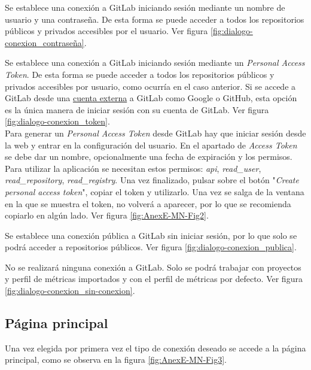 \begin{description}
	\tightlist
	\item[Iniciar sesión en GitLab mediante usuario y contraseña.] Se establece una conexión a GitLab iniciando sesión mediante un nombre de usuario y una contraseña. De esta forma se puede acceder a todos los repositorios públicos y privados accesibles por el usuario. Ver figura \ref{fig:dialogo-conexion_contraseña}.
	\item[Iniciar sesión en GitLab mediante \textit{Personal Access Token}.] Se establece una conexión a GitLab iniciando sesión mediante un \textit{Personal Access Token}. De esta forma se puede acceder a todos los repositorios públicos y privados accesibles por usuario, como ocurría en el caso anterior. 
	Si se accede a GitLab desde una \underline{cuenta externa} a GitLab como Google o GitHub, esta opción es la única manera de iniciar sesión con su cuenta de GitLab. Ver figura \ref{fig:dialogo-conexion_token}.\\
	Para generar un \textit{Personal Access Token} desde GitLab hay que iniciar sesión desde la web y entrar en la configuración del usuario. En el apartado de \textit{Access Token} se debe dar un nombre, opcionalmente una fecha de expiración y los permisos. Para utilizar la aplicación se necesitan estos permisos: \textit{api}, \textit{read\_user}, \textit{read\_repository}, \textit{read\_registry}. Una vez finalizado, pulsar sobre el botón "\textit{Create personal access token}", copiar el token y utilizarlo. Una vez se salga de la ventana en la que se muestra el token, no volverá a aparecer, por lo que se recomienda copiarlo en algún lado. Ver figura \ref{fig:AnexE-MN-Fig2}.
	\item[Usar una conexión pública hacia GitLab.] Se establece una conexión pública a GitLab sin iniciar sesión, por lo que solo se podrá acceder a repositorios públicos. Ver figura \ref{fig:dialogo-conexion_publica}.
	\item[No utilizar ninguna conexión.] No se realizará ninguna conexión a GitLab. Solo se podrá trabajar con proyectos y perfil de métricas importados y con el perfil de métricas por defecto. Ver figura \ref{fig:dialogo-conexion_sin-conexion}.
\end{description}

\subsection{Página principal}
Una vez elegida por primera vez el tipo de conexión deseado se accede a la página principal, como se observa en la figura \ref{fig:AnexE-MN-Fig3}.
